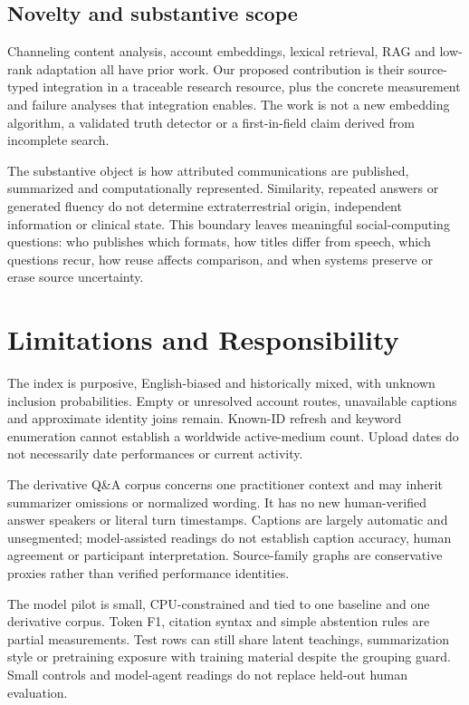 \subsection{Novelty and substantive scope}
Channeling content analysis, account embeddings, lexical retrieval, RAG and low-rank adaptation all have prior work. Our proposed contribution is their source-typed integration in a traceable research resource, plus the concrete measurement and failure analyses that integration enables. The work is not a new embedding algorithm, a validated truth detector or a first-in-field claim derived from incomplete search.

The substantive object is how attributed communications are published, summarized and computationally represented. Similarity, repeated answers or generated fluency do not determine extraterrestrial origin, independent information or clinical state. This boundary leaves meaningful social-computing questions: who publishes which formats, how titles differ from speech, which questions recur, how reuse affects comparison, and when systems preserve or erase source uncertainty.

\section{Limitations and Responsibility}
The index is purposive, English-biased and historically mixed, with unknown inclusion probabilities. Empty or unresolved account routes, unavailable captions and approximate identity joins remain. Known-ID refresh and keyword enumeration cannot establish a worldwide active-medium count. Upload dates do not necessarily date performances or current activity.

The derivative Q\&A corpus concerns one practitioner context and may inherit summarizer omissions or normalized wording. It has no new human-verified answer speakers or literal turn timestamps. Captions are largely automatic and unsegmented; model-assisted readings do not establish caption accuracy, human agreement or participant interpretation. Source-family graphs are conservative proxies rather than verified performance identities.

The model pilot is small, CPU-constrained and tied to one baseline and one derivative corpus. Token F1, citation syntax and simple abstention rules are partial measurements. Test rows can still share latent teachings, summarization style or pretraining exposure with training material despite the grouping guard. Small controls and model-agent readings do not replace held-out human evaluation.

